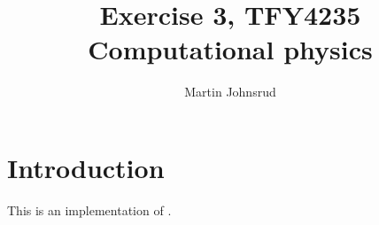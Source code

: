 \documentclass{article}
\title{Exercise 3, TFY4235 Computational physics}
\author{Martin Johnsrud}
\date{}
\begin{document}
    \maketitle
    \section*{Introduction}
        This is an implementation of \cite{exercise}.
    
    
\end{document}
